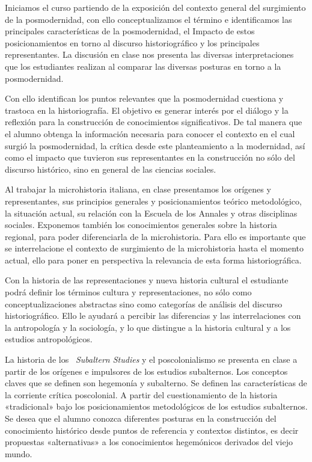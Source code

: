 Iniciamos el curso partiendo de la exposición del contexto general del 
surgimiento de la posmodernidad, con ello conceptualizamos el término e 
identificamos las principales características de la posmodernidad, el 
Impacto de estos posicionamientos en torno al discurso historiográfico 
y los principales representantes. La discusión en clase nos presenta 
las diversas interpretaciones que los estudiantes realizan al comparar 
las diversas posturas en torno a la posmodernidad. 

Con ello identifican los puntos relevantes que la posmodernidad 
cuestiona y trastoca en la historiografía. El objetivo es generar 
interés por el diálogo y la reflexión para la construcción de 
conocimientos significativos. De tal manera que el alumno obtenga la 
información necesaria para conocer el contexto en el cual surgió la 
posmodernidad, la crítica desde este planteamiento a la modernidad, así 
como el impacto que tuvieron sus representantes en la construcción no 
sólo del discurso histórico, sino en general de las ciencias sociales.

Al trabajar la microhistoria italiana, en clase presentamos los 
orígenes y representantes, sus principios generales y posicionamientos 
teórico metodológico, la situación actual, su relación con la Escuela 
de los Annales y otras disciplinas sociales. Exponemos también los 
conocimientos generales sobre la historia regional, para poder 
diferenciarla de la microhistoria. Para ello es importante que se 
interrelacione el contexto de surgimiento de la microhistoria hasta el 
momento actual, ello para poner en perspectiva la relevancia de esta 
forma historiográfica.

Con la historia de las representaciones y nueva historia cultural el 
estudiante podrá definir los términos cultura y representaciones, no 
sólo como conceptualizaciones abstractas sino como categorías de 
análisis del discurso historiográfico. Ello le ayudará a percibir las 
diferencias y las interrelaciones con la antropología y la sociología, 
y lo que distingue a la historia cultural y a los estudios 
antropológicos.

La historia de los {\itshape\ Subaltern Studies\/} y el poscolonialismo 
se presenta en clase a partir de los orígenes e impulsores de los estudios 
subalternos. Los conceptos claves que se definen son hegemonía y 
subalterno. Se definen las características de la corriente crítica 
poscolonial. A partir del cuestionamiento de la historia «tradicional» 
bajo los posicionamientos metodológicos de los estudios subalternos. Se 
desea que el alumno conozca diferentes posturas en la construcción del 
conocimiento histórico desde puntos de referencia y contextos 
distintos, es decir propuestas «alternativas» a los conocimientos 
hegemónicos derivados del viejo mundo. 


